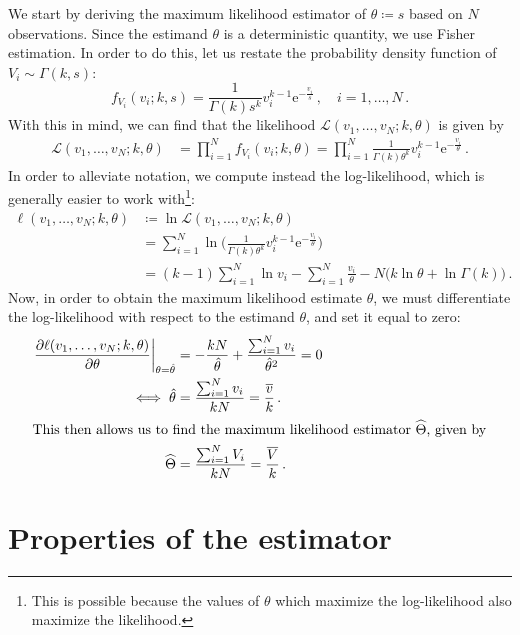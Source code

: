 \documentclass[final]{aomart}
\newtheorem[{}\it]{thm}{Theorem}[section]
\theoremstyle{definition}
\newtheorem*[{}\it]{notation}{Notation}
\numberwithin{equation}{section}
\newcommand{\wh}{\widehat}
\newcommand{\like}{\mathcal{L}} %
\newcommand{\e}{\mathrm{e}} %
\newcommand{\pdf}{f} %
\newcommand{\htheta}{\hat{\theta}} %
\newcommand{\hTheta}{\wh{\Theta}} %
\newcommand{\eval}[2][\right]{\relax
  \ifx#1\right\relax \left.\fi#2#1\rvert}
\begin{document}
We start by deriving the maximum likelihood estimator of \(\theta \coloneqq s\) based on \(N\) observations.
Since the estimand $\theta$ is a deterministic quantity, we use Fisher estimation.
In order to do this, let us restate the probability density function of \(V_i \sim \Gamma(k, s)\):
\begin{equation}
\pdf_{V_i}(v_i; k, s) = \frac{1}{\Gamma(k) s^k} v_i^{k-1} \e^{-\frac{v_i}{s}}\,, \quad i = 1, \ldots, N\,.
\end{equation}
With this in mind, we can find that the likelihood \(\like(v_1, \ldots, v_N; k, \theta)\) is given by
\begin{align}
\like(v_1, \ldots, v_N; k, \theta) &= \prod_{i=1}^{N} \pdf_{V_i}(v_i; k,\theta) = \prod_{i=1}^{N} \frac{1}{\Gamma(k) \theta^k} v_i^{k-1} \e^{-\frac{v_i}{\theta}}\,.
\end{align}
In order to alleviate notation, we compute instead the log-likelihood, which is generally easier to work with\footnote{This is possible because the values of \(\theta\) which maximize the log-likelihood also maximize the likelihood.}:
\begin{align}
\ell(v_1, \ldots, v_N; k, \theta) &\coloneqq \ln \like(v_1, \ldots, v_N; k, \theta)\\
&= \sum_{i=1}^{N} \ln\Bigg(\frac{1}{\Gamma(k) \theta^k} v_i^{k-1} \e^{-\frac{v_i}{\theta}}\Bigg)\\
&= (k-1) \sum_{i=1}^{N}\ln v_i - \sum_{i=1}^{N} \frac{v_i}{\theta} - N \big(k \ln \theta + \ln \Gamma(k)\big)\,.\label{eq:loglikelihood}
\end{align}
Now, in order to obtain the maximum likelihood estimate \(\htheta\), we must differentiate the log-likelihood with respect to the estimand \(\theta\), and set it equal to zero:
\begin{align}
\eval{\frac{\partial \ell(v_1, \ldots, v_N; k, \theta)}{\partial \theta}}_{\theta = \htheta} &= -\frac{kN}{\htheta} + \frac{\sum_{i=1}^{N} v_i}{\htheta^2} = 0\\
\iff \htheta &= \frac{\sum_{i=1}^{N} v_i}{kN} = \frac{\widebar{v}}{k}\,.\\
\intertext{This then allows us to find the maximum likelihood estimator \(\hTheta\), given by}
\hTheta &= \frac{\sum_{i=1}^{N} V_i}{kN} = \frac{\widebar{V}}{k}\,.\label{eq:mlestimator}
\end{align}

\section{Properties of the estimator}
\end{document}
